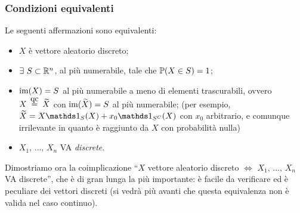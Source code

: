 \subsubsection{Condizioni equivalenti}
Le seguenti affermazioni sono equivalenti:
\begin{itemize}
  \item $X$ è vettore aleatorio discreto;
  \item $\exists \ S \subset \mathbb R^n$, al più numerabile, tale che $\mathbb P(X \in S) = 1$;
  \item $\operatorname{im}(X) = S$ al più numerabile a meno di elementi trascurabili, ovvero $X \aceq \widetilde{X}$ con $\operatorname{im}(\widetilde{X}) = S$ al più numerabile;
   (per esempio, $\widetilde{X} = X \Ind_S (X) + x_0 \Ind_{S^C} (X)$ con $x_0$ arbitrario, e comunque irrilevante in quanto è raggiunto da $X$ con probabilità nulla)
  \item $X_1, \, \dots, \, X_n$ VA \emph{discrete}.
\end{itemize}


Dimostriamo ora la coimplicazione ``$X$ vettore aleatorio discreto $\iff$ $X_1, \, \dots, \, X_n$ VA discrete'', che è di gran lunga la più importante: è facile da verificare ed è peculiare dei vettori discreti (si vedrà più avanti che questa equivalenza non è valida nel caso continuo).


